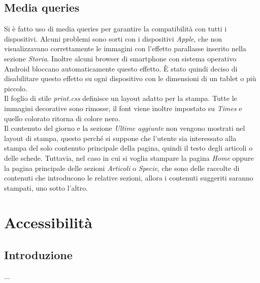\documentclass[12pt]{article}
\begin{document}
	\subsection{Media queries}
	Si è fatto uso di media queries per garantire la compatibilità con tutti i dispositivi. Alcuni problemi sono sorti con i dispositivi \textit{Apple}, che non visualizzavano correttamente le immagini con l'effetto parallasse inserito nella sezione \textit{Storia}. Inoltre alcuni browser di smartphone con sistema operativo Android bloccano automaticamente questo effetto. È stato quindi deciso di disabilitare questo effetto su ogni dispositivo con le dimensioni di un tablet o più piccolo.\\
	Il foglio di stile \textit{print.css} definisce un layout adatto per la stampa. Tutte le immagini decorative sono rimosse, il font viene inoltre impostato su \textit{Times} e quello colorato ritorna di colore nero.\\
	Il contenuto del giorno e la sezione \textit{Ultime aggiunte} non vengono mostrati nel layout di stampa, questo perché si suppone che l'utente sia interessato alla stampa del solo contenuto principale della pagina, quindi il testo degli articoli o delle schede. Tuttavia, nel caso in cui si voglia stampare la pagina \textit{Home} oppure la pagina principale delle sezioni \textit{Articoli} o \textit{Specie}, che sono delle raccolte di contenuti che introducono le relative sezioni, allora i contenuti suggeriti saranno stampati, uno sotto l'altro.

		
	\section{Accessibilità}
	\subsection{Introduzione}
	...
	
\end{document}
